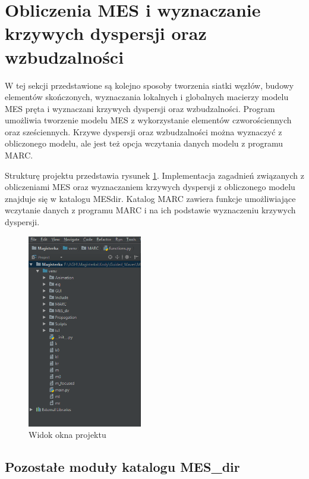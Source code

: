 \section{Obliczenia MES i wyznaczanie krzywych dyspersji oraz wzbudzalności}
\label{cha:obliczenia_mes}

W tej sekcji przedstawione są kolejno sposoby tworzenia siatki węzłów, budowy elementów skończonych, wyznaczania lokalnych i globalnych macierzy modelu MES pręta i wyznaczani krzywych dyspersji oraz wzbudzalności. Program umożliwia tworzenie modelu MES z wykorzystanie elementów czworościennych oraz sześciennych. Krzywe dyspersji oraz wzbudzalności można wyznaczyć z obliczonego modelu, ale jest też opcja wczytania danych modelu z programu MARC.

Strukturę projektu przedstawia rysunek \ref{fig:okno_projektu}. Implementacja zagadnień związanych z obliczeniami MES oraz wyznaczaniem krzywych dyspersji z obliczonego modelu znajduje się w katalogu MES\textunderscore dir. Katalog MARC zawiera funkcje umożliwiające wczytanie danych z programu MARC i na ich podstawie wyznaczeniu krzywych dyspersji.

\begin{figure}[h]
\centering
\includegraphics[width=5cm]{Zdjecia/5/okno_projektu}
\caption{Widok okna projektu}
\label{fig:okno_projektu}
\end{figure}








\subsection{Pozostałe moduły katalogu MES\_dir}
\label{cha:pozostale_moduly}

